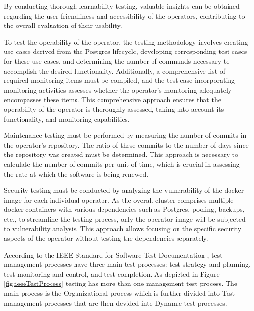 By conducting thorough learnability testing, valuable insights can be obtained regarding the user-friendliness and accessibility of the operators, contributing to the overall evaluation of their usability.

To test the operability of the operator, the testing methodology involves creating use cases derived from the Postgres lifecycle, developing corresponding test cases for these use cases, and determining the number of commands necessary to accomplish the desired functionality. Additionally, a comprehensive list of required monitoring items must be compiled, and the test case incorporating monitoring activities assesses whether the operator's monitoring adequately encompasses these items. This comprehensive approach ensures that the operability of the operator is thoroughly assessed, taking into account its functionality, and monitoring capabilities.

Maintenance testing must be performed by measuring the number of commits in the operator's repository. The ratio of these commits to the number of days since the repository was created must be determined. This approach is necessary to calculate the number of commits per unit of time, which is crucial in assessing the rate at which the software is being renewed.

Security testing must be conducted by analyzing the vulnerability of the docker image for each individual operator. As the overall cluster comprises multiple docker containers with various dependencies such as Postgres, pooling, backups, etc., to streamline the testing process, only the operator image will be subjected to vulnerability analysis. This approach allows focusing on the specific security aspects of the operator without testing the dependencies separately.


According to the IEEE Standard for Software Test Documentation \cite{ieeeTestProcess}, test management processes have three main test processes: test strategy and planning, test monitoring and control, and test completion.
As depicted in Figure \ref{fig:ieeeTestProcess} testing has more than one management test process. The main process is the Organizational process which is further divided into Test management processes that are then devided into Dynamic test processes.


